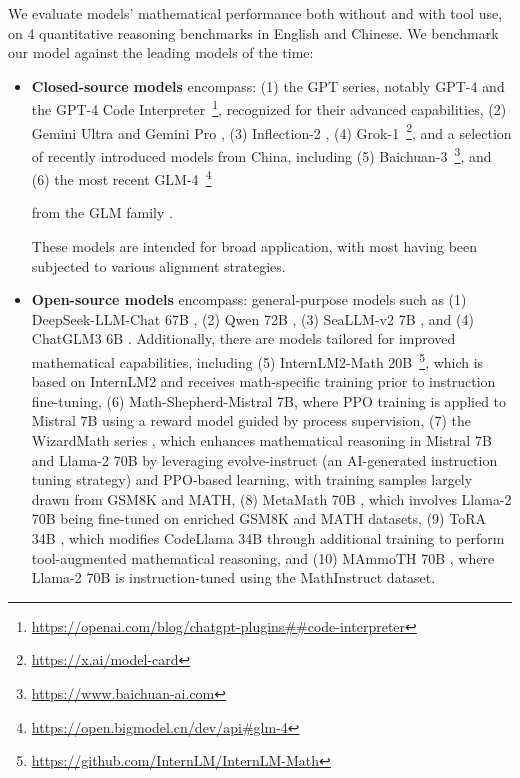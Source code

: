 \begin{itemize}[topsep=0pt]
We evaluate models' mathematical performance both without and with tool use, on 4 quantitative reasoning benchmarks in English and Chinese. We benchmark our model against the leading models of the time:

\begin{itemize}[topsep=0pt]
    \item \textbf{Closed-source models} encompass: (1) the GPT series, notably GPT-4 \citep{gpt4} and the GPT-4 Code Interpreter~\footnote{\url{https://openai.com/blog/chatgpt-plugins\#\#code-interpreter}}, recognized for their advanced capabilities, (2) Gemini Ultra and Gemini Pro \citep{gemini}, (3) Inflection-2 \citep{inflection-2}, (4) Grok-1~\footnote{\url{https://x.ai/model-card}}, and a selection of recently introduced models from China, including (5) Baichuan-3~\footnote{\url{https://www.baichuan-ai.com}}, and (6) the most recent GLM-4~\footnote{\url{https://open.bigmodel.cn/dev/api\#glm-4}}

    from the GLM family \citep{glm}.

These models are intended for broad application, with most having been subjected to various alignment strategies.

\item \textbf{Open-source models} encompass: general-purpose models such as (1) DeepSeek-LLM-Chat 67B \citep{deepseek-llm}, (2) Qwen 72B \citep{qwen}, (3) SeaLLM-v2 7B \citep{seallm}, and (4) ChatGLM3 6B \citep{chatglm3}. Additionally, there are models tailored for improved mathematical capabilities, including (5) InternLM2-Math 20B~\footnote{\url{https://github.com/InternLM/InternLM-Math}}, which is based on InternLM2 and receives math-specific training prior to instruction fine-tuning, (6) Math-Shepherd-Mistral 7B, where PPO training \citep{schulman2017proximal} is applied to Mistral 7B \citep{mistral} using a reward model guided by process supervision, (7) the WizardMath series \citep{wizardmath}, which enhances mathematical reasoning in Mistral 7B and Llama-2 70B \citep{llama2} by leveraging evolve-instruct (an AI-generated instruction tuning strategy) and PPO-based learning, with training samples largely drawn from GSM8K and MATH, (8) MetaMath 70B \citep{metamath}, which involves Llama-2 70B being fine-tuned on enriched GSM8K and MATH datasets, (9) ToRA 34B \cite{tora}, which modifies CodeLlama 34B through additional training to perform tool-augmented mathematical reasoning, and (10) MAmmoTH 70B \citep{MathInstruct}, where Llama-2 70B is instruction-tuned using the MathInstruct dataset.


\end{itemize}
\end{itemize}
